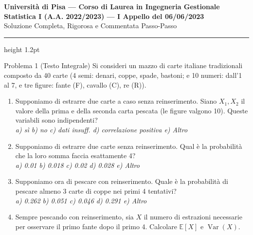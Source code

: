\documentclass[11pt,a4paper]{article}
\newcommand{\EE}{\mathbb{E}}
\newcommand{\Var}{\operatorname{Var}}
\begin{document}
\begin{center}
    {\LARGE\bfseries\color{navyblue} Università di Pisa --- Corso di Laurea in Ingegneria Gestionale}\\[0.4em]
    {\Large\bfseries Statistica I (A.A. 2022/2023) --- I Appello del 06/06/2023}\\[0.3em]
    {\large\textsf{Soluzione Completa, Rigorosa e Commentata Passo-Passo}}
\end{center}
\vspace{0.5em}
\hrule height 1.2pt
\vspace{1.5em}

\begin{problemabox}{Problema 1 (Testo Integrale)}
Si consideri un mazzo di carte italiane tradizionali composto da 40 carte (4 semi: denari, coppe, spade, bastoni; e 10 numeri: dall'1 al 7, e tre figure: fante (F), cavallo (C), re (R)).
\begin{enumerate}[label=(\alph*)]
    \item Supponiamo di estrarre due carte a caso senza reinserimento. Siano $X_1, X_2$ il valore della prima e della seconda carta pescata (le figure valgono 10). Queste variabili sono indipendenti?\\
    \emph{a) sì \quad b) no \quad c) dati insuff. \quad d) correlazione positiva \quad e) Altro}
    \item Supponiamo di estrarre due carte senza reinserimento. Qual è la probabilità che la loro somma faccia esattamente 4?\\
    \emph{a) 0.01 \quad b) 0.018 \quad c) 0.02 \quad d) 0.028 \quad e) Altro}
    \item Supponiamo ora di pescare con reinserimento. Quale è la probabilità di pescare almeno 3 carte di coppe nei primi 4 tentativi?\\
    \emph{a) 0.262 \quad b) 0.051 \quad c) 0.046 \quad d) 0.291 \quad e) Altro}
    \item Sempre pescando con reinserimento, sia $X$ il numero di estrazioni necessarie per osservare il primo fante dopo il primo 4. Calcolare $\EE[X]$ e $\Var(X)$.
\end{enumerate}
\end{problemabox}
\end{document}
